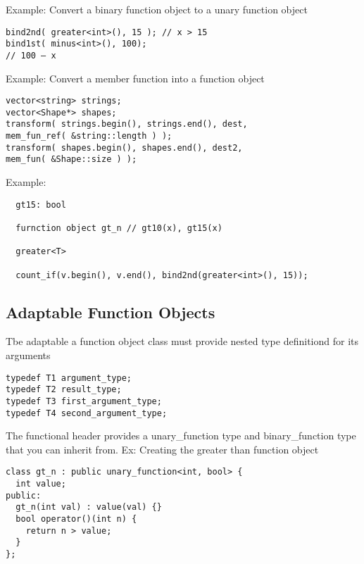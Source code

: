 \documentclass[12pt]{article}
\begin{document}
Example: Convert a binary function object to a unary function object

\begin{lstlisting}
bind2nd( greater<int>(), 15 ); // x > 15
bind1st( minus<int>(), 100);
// 100 – x
\end{lstlisting}
Example: Convert a member function into a function object
\begin{lstlisting}
vector<string> strings;
vector<Shape*> shapes;
transform( strings.begin(), strings.end(), dest,
mem_fun_ref( &string::length ) );
transform( shapes.begin(), shapes.end(), dest2,
mem_fun( &Shape::size ) );
\end{lstlisting}
Example:
\begin{lstlisting}
  gt15: bool

  furnction object gt_n // gt10(x), gt15(x)

  greater<T>

  count_if(v.begin(), v.end(), bind2nd(greater<int>(), 15));
\end{lstlisting}

\subsection*{Adaptable Function Objects}
Tbe adaptable a function object class must provide nested type definitiond for its arguments
\begin{lstlisting}
typedef T1 argument_type;
typedef T2 result_type;
typedef T3 first_argument_type;
typedef T4 second_argument_type;
\end{lstlisting}

The functional header provides a unary_function type and binary_function type that you can inherit from.
Ex: Creating the greater than function object
\begin{lstlisting}
class gt_n : public unary_function<int, bool> {
  int value;
public:
  gt_n(int val) : value(val) {}
  bool operator()(int n) {
    return n > value;
  }
};
\end{lstlisting}
\end{document}
